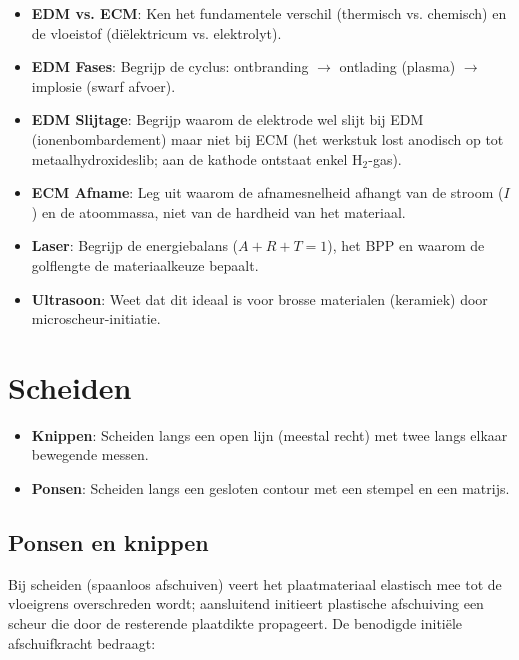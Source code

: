 \documentclass[a4paper,11pt,twoside]{report}
\begin{document}
\begin{warningbox}
    \begin{itemize}
        \item \textbf{EDM vs. ECM}: Ken het fundamentele verschil (thermisch vs. chemisch) en de vloeistof (diëlektricum vs. elektrolyt).
        \item \textbf{EDM Fases}: Begrijp de cyclus: ontbranding $\to$ ontlading (plasma) $\to$ implosie (swarf afvoer).
        \item \textbf{EDM Slijtage}: Begrijp waarom de elektrode wel slijt bij EDM (ionenbombardement) maar niet bij ECM (het werkstuk lost anodisch op tot metaalhydroxideslib; aan de kathode ontstaat enkel $\text{H}_2$-gas).
        \item \textbf{ECM Afname}: Leg uit waarom de afnamesnelheid afhangt van de stroom ($I$) en de atoommassa, niet van de hardheid van het materiaal.
        \item \textbf{Laser}: Begrijp de energiebalans ($A+R+T=1$), het BPP en waarom de golflengte de materiaalkeuze bepaalt.
        \item \textbf{Ultrasoon}: Weet dat dit ideaal is voor brosse materialen (keramiek) door microscheur-initiatie.
    \end{itemize}
\end{warningbox}

\chapter{Scheiden}

\begin{conceptbox}
    \begin{itemize}
        \item \textbf{Knippen}: Scheiden langs een open lijn (meestal recht) met twee langs elkaar bewegende messen.
        \item \textbf{Ponsen}: Scheiden langs een gesloten contour met een stempel en een matrijs.
    \end{itemize}
\end{conceptbox}

\section{Ponsen en knippen}
Bij scheiden (spaanloos afschuiven) veert het plaatmateriaal elastisch mee tot de vloeigrens overschreden wordt; aansluitend initieert plastische afschuiving een scheur die door de resterende plaatdikte propageert. De benodigde initiële afschuifkracht bedraagt:
\end{document}

